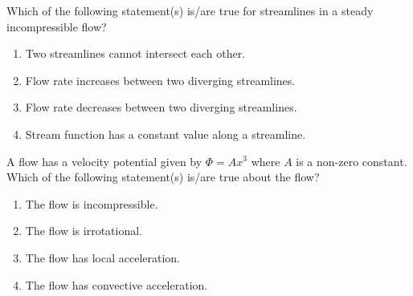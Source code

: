     \item Which of the following statement(s) is/are true for streamlines in a steady incompressible flow?
    \begin{enumerate}
        \item Two streamlines cannot intersect each other.
        \item Flow rate increases between two diverging streamlines.
        \item Flow rate decreases between two diverging streamlines.
        \item Stream function has a constant value along a streamline.
    \end{enumerate}

    \bigskip

    \item A flow has a velocity potential given by $\Phi = Ax^3$ where $A$ is a non-zero constant. Which of the following statement(s) is/are true about the flow?
    \begin{enumerate}
        \item The flow is incompressible.
        \item The flow is irrotational.
        \item The flow has local acceleration.
        \item The flow has convective acceleration.
    \end{enumerate}

    \bigskip

